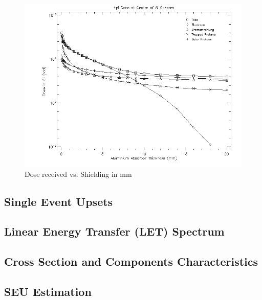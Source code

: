 \begin{figure}[h]
	\centering
	\includegraphics[width=\linewidth-5em]{spenvis/memory_rad}
		\caption{Dose received vs. Shielding in mm}
		 \label{fig:rad_memory}
\end{figure}
\subsection{Single Event Upsets}

\subsection{Linear Energy Transfer (LET) Spectrum}

\subsection{Cross Section and Components Characteristics}

\subsection{SEU Estimation}